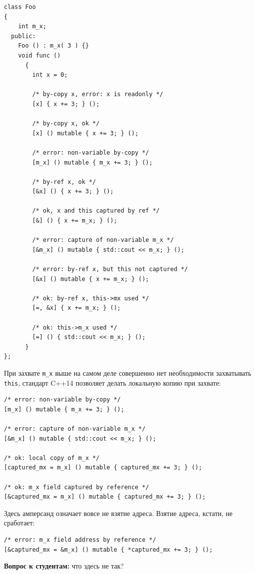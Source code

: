 \documentclass[a4paper,12pt,oneside]{book}
\begin{document}
\begin{lstlisting}
class Foo
{
    int m_x;
  public:
    Foo () : m_x( 3 ) {}
    void func ()
      {
        int x = 0;

        /* by-copy x, error: x is readonly */
        [x] { x += 3; } ();
        
        /* by-copy x, ok */
        [x] () mutable { x += 3; } ();

        /* error: non-variable by-copy */
        [m_x] () mutable { m_x += 3; } (); 

        /* by-ref x, ok */
        [&x] () { x += 3; } ();

        /* ok, x and this captured by ref */
        [&] () { x += m_x; } ();

        /* error: capture of non-variable m_x */
        [&m_x] () mutable { std::cout << m_x; } (); 

        /* error: by-ref x, but this not captured */
        [&x] () mutable { x += m_x; } (); 

        /* ok: by-ref x, this->mx used */
        [=, &x] { x += m_x; } ();

        /* ok: this->m_x used */
        [=] () { std::cout << m_x; } ();
      }
};
\end{lstlisting}

При захвате \lstinline!m_x! выше на самом деле совершенно нет необходимости захватывать \lstinline!this!, стандарт C++14 позволяет делать локальную копию при захвате:

\begin{lstlisting}
/* error: non-variable by-copy */
[m_x] () mutable { m_x += 3; } (); 

/* error: capture of non-variable m_x */
[&m_x] () mutable { std::cout << m_x; } (); 

/* ok: local copy of m_x */
[captured_mx = m_x] () mutable { captured_mx += 3; } (); 

/* ok: m_x field captured by reference */
[&captured_mx = m_x] () mutable { captured_mx += 3; } (); 
\end{lstlisting}

Здесь амперсанд означает вовсе не взятие адреса. Взятие адреса, кстати, не сработает:

\begin{lstlisting}
/* error: m_x field address by reference */
[&captured_mx = &m_x] () mutable { *captured_mx += 3; } ();
\end{lstlisting}

\textbf{Вопрос к студентам:} что здесь не так?
\end{document}
